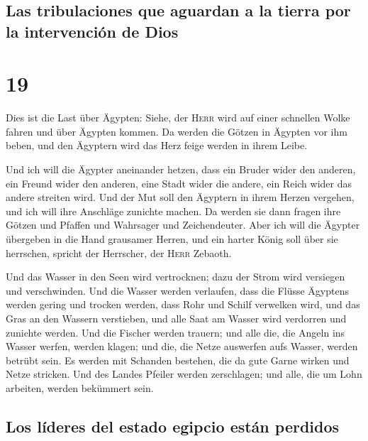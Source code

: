 \hypertarget{las-tribulaciones-que-aguardan-a-la-tierra-por-la-intervenciuxf3n-de-dios}{%
\subsection{Las tribulaciones que aguardan a la tierra por la
intervención de
Dios}\label{las-tribulaciones-que-aguardan-a-la-tierra-por-la-intervenciuxf3n-de-dios}}

\hypertarget{section-18}{%
\section{19}\label{section-18}}

 Dies ist die Last über Ägypten: Siehe, der \textsc{Herr}
wird auf einer schnellen Wolke fahren und über Ägypten kommen. Da werden
die Götzen in Ägypten vor ihm beben, und den Ägyptern wird das Herz
feige werden in ihrem Leibe.

 Und ich will die Ägypter aneinander hetzen, dass ein
Bruder wider den anderen, ein Freund wider den anderen, eine Stadt wider
die andere, ein Reich wider das andere streiten wird.  Und
der Mut soll den Ägyptern in ihrem Herzen vergehen, und ich will ihre
Anschläge zunichte machen. Da werden sie dann fragen ihre Götzen und
Pfaffen und Wahrsager und Zeichendeuter.  Aber ich will
die Ägypter übergeben in die Hand grausamer Herren, und ein harter König
soll über sie herrschen, spricht der Herrscher, der \textsc{Herr}
Zebaoth.

 Und das Wasser in den Seen wird vertrocknen; dazu der
Strom wird versiegen und verschwinden.  Und die Wasser
werden verlaufen, dass die Flüsse Ägyptens werden gering und trocken
werden, dass Rohr und Schilf verwelken wird,  und das Gras
an den Wassern verstieben, und alle Saat am Wasser wird verdorren und
zunichte werden.  Und die Fischer werden trauern; und alle
die, die Angeln ins Wasser werfen, werden klagen; und die, die Netze
auswerfen aufs Wasser, werden betrübt sein.  Es werden mit
Schanden bestehen, die da gute Garne wirken und Netze stricken.
 Und des Landes Pfeiler werden zerschlagen; und alle, die
um Lohn arbeiten, werden bekümmert sein.

\hypertarget{los-luxedderes-del-estado-egipcio-estuxe1n-perdidos}{%
\subsection{Los líderes del estado egipcio están
perdidos}\label{los-luxedderes-del-estado-egipcio-estuxe1n-perdidos}}

